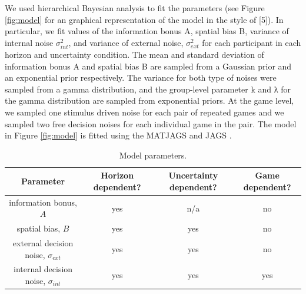 \documentclass[12pt]{article}
\begin{document}
	We used hierarchical Bayesian analysis to fit the parameters (see Figure \ref{fig:model} for an graphical representation of the model in the style of [5]). In particular, we fit values of the information bonus A, spatial bias B, variance of internal noise $\sigma_{int}^2$, and variance of external noise, $\sigma_{ext}^2$ for each participant in each horizon and uncertainty condition. The mean and standard deviation of information bonus A and spatial bias B are sampled from a Gaussian prior and an exponential prior respectively. The variance for both type of noises were sampled from a gamma distribution, and the group-level parameter k and λ for the gamma distribution are sampled from exponential priors. At the game level, we sampled one stimulus driven noise for each pair of repeated games and we sampled two free decision noises for each individual game in the pair.  The model in Figure \ref{fig:model} is fitted using the MATJAGS and JAGS \cite{}.
	
	\begin{table}[H]
		\small
		\begin{center}
			\begin{tabular}{|c|c|c|c|}
				\hline
				Parameter &
				Horizon dependent? &
				Uncertainty dependent? &
				Game dependent? \\
				\hline
				information bonus, $A$ &
				yes &
				n/a &
				no \\
				\hline
				spatial bias, $B$ &
				yes &
				yes &
				no \\
				\hline
				external decision noise, $\sigma_{ext}$ &
				yes & 
				yes &
				no \\
				\hline
				internal decision noise, $\sigma_{int}$ &
				yes & 
				yes &
				yes \\
				\hline
			\end{tabular}
		\end{center}
		\caption{Model parameters. }
		\label{table1}
	\end{table}%
	
	
	
\end{document}
